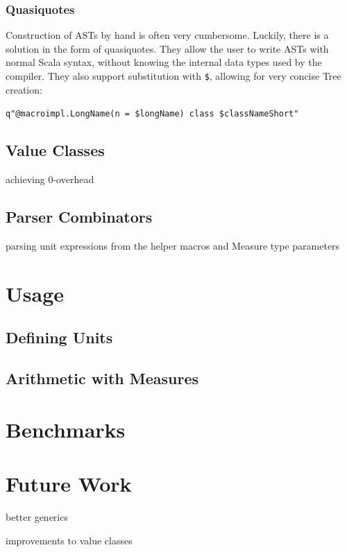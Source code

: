 \documentclass[12pt,oneside,a4paper]{scrbook}
\theoremstyle{definition}
\begin{document}
\subsection{Quasiquotes}

Construction of ASTs by hand is often very cumbersome. Luckily, there is a solution in the form of quasiquotes. They allow the user to write ASTs with normal Scala syntax, without knowing the internal data types used by the compiler. They also support substitution with \verb|$|, allowing for very concise Tree creation:

\verb|q"@macroimpl.LongName(n = $longName) class $classNameShort"|



\section{Value Classes}



achieving 0-overhead

\section{Parser Combinators}

parsing unit expressions from the helper macros and Measure type parameters

\chapter{Usage}

\section{Defining Units}
\section{Arithmetic with Measures}

\chapter{Benchmarks}

\chapter{Future Work}

better generics

improvements to value classes
\end{document}
